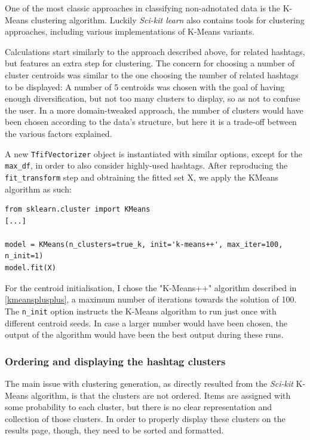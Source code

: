 \documentclass[12pt,a4paper,twoside]{report}
\begin{document}
One of the most classic approaches in classifying non-adnotated data is the K-Means clustering algorithm. Luckily \emph{Sci-kit learn} also contains tools for clustering approaches, including various implementations of K-Means variants.

Calculations start similarly to the approach described above, for related hashtags, but features an extra step for clustering. The concern for choosing a number of cluster centroids was similar to the one choosing the number of related hashtags to be displayed: A number of 5 centroids was chosen with the goal of having enough diversification, but not too many clusters to display, so as not to confuse the user. In a more domain-tweaked approach, the number of clusters would have been chosen according to the data's structure, but here it is a trade-off between the various factors explained.

A new \texttt{TfifVectorizer} object is instantiated with similar options, except for the \texttt{max\_df}, in order to also consider highly-used hashtags. After reproducing the \texttt{fit\_transform} step and obtraining the fitted set X, we apply the KMeans algorithm as such:

\lstset{basicstyle=\small, breaklines=True}
\begin{lstlisting}
from sklearn.cluster import KMeans
[...]

model = KMeans(n_clusters=true_k, init='k-means++', max_iter=100, n_init=1)
model.fit(X)
\end{lstlisting}

For the centroid initialisation, I chose the "K-Means++" algorithm described in \ref{kmeansplusplus}, a maximum number of iterations towards the solution of 100. The \texttt{n\_init} option instructs the K-Means algorithm to run  just once with different centroid seeds. In case a larger number would have been chosen, the output of the algorithm would have been the best output during these runs.

\subsubsection{Ordering and displaying the hashtag clusters}
The main issue with clustering generation, as directly resulted from the \emph{Sci-kit} K-Means algorithm, is that the clusters are not ordered. Items are assigned with some probability to each cluster, but there is no clear representation and collection of those clusters. In order to properly display these clusters on the results page, though, they need to be sorted and formatted.
\end{document}
